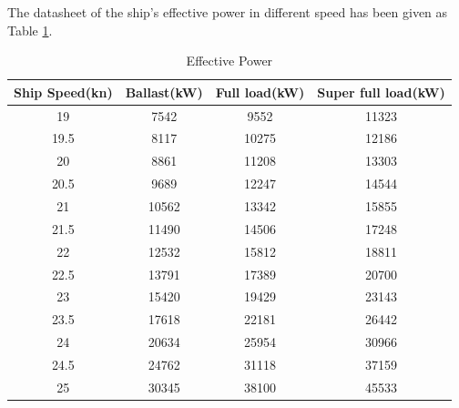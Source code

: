 \documentclass[a4paper,UTF8]{article}
\begin{document}
The datasheet of the ship's effective power in different speed has been given as Table \ref{tab:ep}.
\begin{table}[htbp]
	\centering
	\begin{tabular}{cccc}
		\hline
		Ship Speed(kn) & Ballast(kW) &Full load(kW) & Super full load(kW) \bigstrut\\
		\hline
		19    & 7542  & 9552  & 11323 \bigstrut\\

		19.5  & 8117  & 10275 & 12186 \bigstrut\\

		20    & 8861  & 11208 & 13303 \bigstrut\\

		20.5  & 9689  & 12247 & 14544 \bigstrut\\

		21    & 10562 & 13342 & 15855 \bigstrut\\

		21.5  & 11490 & 14506 & 17248 \bigstrut\\

		22    & 12532 & 15812 & 18811 \bigstrut\\

		22.5  & 13791 & 17389 & 20700 \bigstrut\\

		23    & 15420 & 19429 & 23143 \bigstrut\\

		23.5  & 17618 & 22181 & 26442 \bigstrut\\

		24    & 20634 & 25954 & 30966 \bigstrut\\

		24.5  & 24762 & 31118 & 37159 \bigstrut\\

		25    & 30345 & 38100 & 45533 \bigstrut\\
		\hline
	\end{tabular}%
    \caption{Effective Power}
	\label{tab:ep}%
\end{table}%
\end{document}
